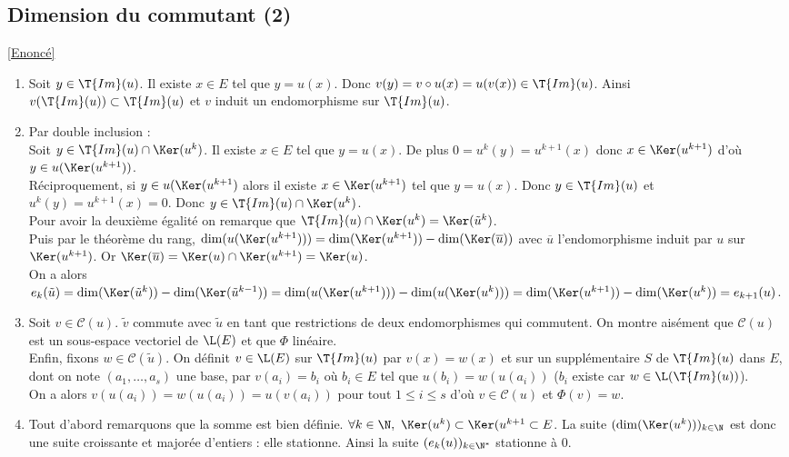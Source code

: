 \documentclass[8pt]{book}
\begin{document}
	\subsection{Dimension du commutant (2) }
	\label{Dimension du commutant (2) corrigé}
	\textcolor{blue}{\hyperref[Dimension du commutant (2)]{[Enoncé]}}\\
	\begin{enumerate}[leftmargin=*]
		\item Soit $y\in \T{Im}(u)$. Il existe $x\in E$ tel que $y=u(x)$. Donc $v(y)=v\circ u(x)=u(v(x))\in \T{Im}(u)$. Ainsi $v(\T{Im}(u))\subset \T{Im}(u)$ et $v$ induit un endomorphisme sur $\T{Im}(u)$.
		\item Par double inclusion :\\
		Soit $y\in \T{Im}(u)\cap\Ker(u^k)$. Il existe $x\in E$ tel que $y=u(x)$. De plus $0=u^k(y)=u^{k+1}(x)$ donc $x\in \Ker(u^{k+1})$ d'où $y\in u(\Ker(u^{k+1}))$.\\
		Réciproquement, si $y\in u(\Ker(u^{k+1})$ alors il existe $x\in \Ker(u^{k+1})$ tel que $y=u(x)$. Donc $y\in \T{Im}(u)$ et $u^k(y)=u^{k+1}(x)=0$. Donc $y\in \T{Im}(u)\cap\Ker(u^k)$.\\
		Pour avoir la deuxième égalité on remarque que $\T{Im}(u)\cap\Ker(u^k)=\Ker(\tilde u^k)$.\\
		Puis par le théorème du rang, $\dim(u(\Ker(u^{k+1})))=\dim(\Ker(u^{k+1}))-\dim(\Ker(\overline u))$ avec $\overline u$ l'endomorphisme induit par $u$ sur $\Ker(u^{k+1})$. Or $\Ker(\overline u)=\Ker(u)\cap\Ker(u^{k+1})=\Ker(u)$.\\
		On a alors $e_k(\tilde u)=\dim(\Ker(\tilde u^k))-\dim(\Ker(\tilde u^{k-1}))=\dim(u(\Ker(u^{k+1})))-\dim(u(\Ker(u^k)))=\dim(\Ker(u^{k+1}))-\dim(\Ker(u^k))=e_{k+1}(u)$.
		\item Soit $v\in \mathcal C(u)$. $\tilde v$ commute avec $\tilde u$ en tant que restrictions de deux endomorphismes qui commutent. On montre aisément que $\mathcal C(u)$ est un sous-espace vectoriel de $\L(E)$ et que $\Phi$ linéaire.\\
		Enfin, fixons $w\in \mathcal C(\tilde u)$. On définit $v\in \L(E)$ sur $\T{Im}(u)$ par $v(x)=w(x)$ et sur un supplémentaire $S$ de $\T{Im}(u)$ dans $E$, dont on note $(a_1,\dots,a_s)$ une base, par $v(a_i)=b_i$ où $b_i\in E$ tel que $u(b_i)=w(u(a_i))$ ($b_i$ existe car $w\in \L(\T{Im}(u))$).\\
		On a alors $v(u(a_i))=w(u(a_i))=u(v(a_i))$ pour tout $1\leq i\leq s$ d'où $v\in \mathcal C(u)$ et $\Phi(v)=w$.
		\item Tout d'abord remarquons que la somme est bien définie. $\forall k\in \N,\ \Ker(u^k)\subset \Ker(u^{k+1}\subset E$. La suite $(\dim(\Ker(u^k)))_{k\in \N}$ est donc une suite croissante et majorée d'entiers : elle stationne. Ainsi la suite $(e_k(u))_{k\in \N^*}$ stationne à $0$.\\

\end{enumerate}
\end{document}
